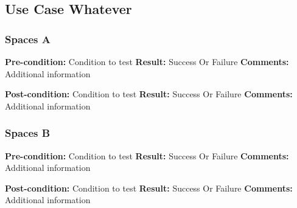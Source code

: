 \subsection{Use Case Whatever}
\subsubsection{Spaces A}
\textbf{Pre-condition:} Condition to test  \newline
\textbf{Result:}  Success Or Failure \newline
\textbf{Comments:} Additional information 

\textbf{Post-condition:} Condition to test  \newline
\textbf{Result:}  Success Or Failure \newline
\textbf{Comments:} Additional information 


\subsubsection{Spaces B}

\textbf{Pre-condition:} Condition to test  \newline
\textbf{Result:}  Success Or Failure \newline
\textbf{Comments:} Additional information 

\textbf{Post-condition:} Condition to test  \newline
\textbf{Result:}  Success Or Failure \newline
\textbf{Comments:} Additional information 


